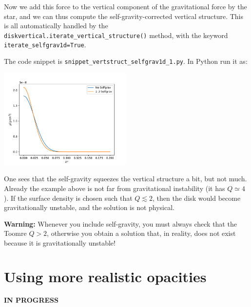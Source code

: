 \documentclass{book}
\newcommand{\code}[1]{{\small\tt #1}}
\begin{document}
Now we add this force to the vertical component of the gravitational force by
the star, and we can thus compute the self-gravity-corrected vertical structure.
This is all automatically handled by the
\code{diskvertical.iterate\_vertical\_structure()} method, with the keyword
\code{iterate\_selfgrav1d=True}.

The code snippet is
\code{snippet\_vertstruct\_selfgrav1d\_1.py}. In Python run it as:
\begin{codebox}
\end{codebox}
\centerline{\includegraphics[width=0.5\textwidth]{../snippets/fig_snippet_vertstruct_selfgrav1d_1_1.pdf}}

One sees that the self-gravity squeezes the vertical structure a bit, but not
much. Already the example above is not far from gravitational instability (it
has $Q\simeq 4$). If the surface density is chosen such that $Q\lesssim 2$, then
the disk would become gravitationally unstable, and the solution is not physical.

{\bf Warning:} Whenever you include self-gravity, you must always check that
the Toomre $Q>2$, otherwise you obtain a solution that, in reality, does not
exist because it is gravitationally unstable!
  
\section{Using more realistic opacities}

{\bf IN PROGRESS}
\end{document}
